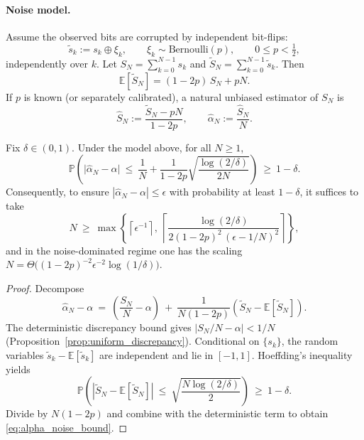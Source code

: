 \paragraph{Noise model.}
Assume the observed bits are corrupted by independent bit-flips:
\begin{equation}
\widetilde s_k := s_k\oplus \xi_k,\qquad \xi_k\sim \mathrm{Bernoulli}(p),\qquad 0\le p<\tfrac12,
\end{equation}
independently over $k$.
Let $S_N=\sum_{k=0}^{N-1}s_k$ and $\widetilde S_N=\sum_{k=0}^{N-1}\widetilde s_k$.
Then
\begin{equation}
\mathbb{E}[\widetilde S_N]=(1-2p)\,S_N+pN.
\end{equation}
If $p$ is known (or separately calibrated), a natural unbiased estimator of $S_N$ is
\begin{equation}
\widehat S_N:=\frac{\widetilde S_N-pN}{1-2p},
\qquad
\widehat\alpha_N:=\frac{\widehat S_N}{N}.
\label{eq:debiased_alpha_estimator}
\end{equation}

\begin{proposition}
\label{prop:bitflip_accuracy}
Fix $\delta\in(0,1)$.
Under the model above, for all $N\ge 1$,
\begin{equation}
\mathbb{P}\!\left(
\bigl|\widehat\alpha_N-\alpha\bigr|
\ \le\ \frac{1}{N}+\frac{1}{1-2p}\sqrt{\frac{\log(2/\delta)}{2N}}
\right)\ \ge\ 1-\delta.
\label{eq:alpha_noise_bound}
\end{equation}
Consequently, to ensure $|\widehat\alpha_N-\alpha|\le \epsilon$ with probability at least $1-\delta$, it suffices to take
\begin{equation}
N\ \ge\ \max\!\left\{\left\lceil \epsilon^{-1}\right\rceil,\ \left\lceil \frac{\log(2/\delta)}{2(1-2p)^2\,(\epsilon-1/N)^2}\right\rceil\right\},
\end{equation}
and in the noise-dominated regime one has the scaling $N=\Theta\!\bigl((1-2p)^{-2}\epsilon^{-2}\log(1/\delta)\bigr)$.
\end{proposition}

\begin{proof}
Decompose
\begin{equation}
\widehat\alpha_N-\alpha
\ =\ \left(\frac{S_N}{N}-\alpha\right)
\ +\ \frac{1}{N(1-2p)}\left(\widetilde S_N-\mathbb{E}[\widetilde S_N]\right).
\end{equation}
The deterministic discrepancy bound gives $|S_N/N-\alpha|<1/N$ (Proposition~\ref{prop:uniform_discrepancy}).
Conditional on $\{s_k\}$, the random variables $\widetilde s_k-\mathbb{E}[\widetilde s_k]$ are independent and lie in $[-1,1]$.
Hoeffding's inequality \cite{Hoeffding1963} yields
\begin{equation}
\mathbb{P}\!\left(
\left|\widetilde S_N-\mathbb{E}[\widetilde S_N]\right|
\ \le\ \sqrt{\frac{N\log(2/\delta)}{2}}
\right)\ \ge\ 1-\delta.
\end{equation}
Divide by $N(1-2p)$ and combine with the deterministic term to obtain \eqref{eq:alpha_noise_bound}.
\end{proof}


